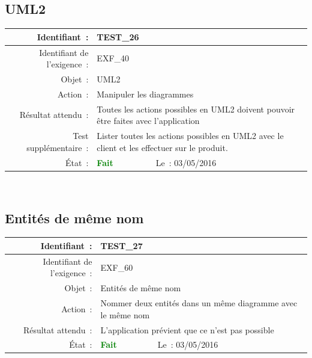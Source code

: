 \documentclass[hidelinks, a4paper,11pt,twoside,final]{article}
\begin{document}
    \subsection*{UML2}
    \begin{tabular}{|r|p{5cm}|p{5cm}|}\hline
    {Identifiant~:} & \multicolumn{2}{|p{10cm}|}{TEST\_26} \\\hline
    {Identifiant de l’exigence~:} & \multicolumn{2}{|p{10cm}|}{EXF\_40} \\\hline
        {Objet~:} & \multicolumn{2}{|p{10cm}|}{UML2} \\\hline
        {Action~:} & \multicolumn{2}{|p{10cm}|}{Manipuler les diagrammes} \\\hline
        {Résultat attendu~:} & \multicolumn{2}{|p{10cm}|}{Toutes les actions possibles en UML2 doivent pouvoir être faites avec l’application} \\\hline
        {Test supplémentaire~:} & \multicolumn{2}{|p{10cm}|}{Lister toutes les actions possibles en UML2 avec le client et les effectuer sur le produit.} \\\hline
        {État~:} & {\textcolor{green}{\textbf{Fait}}} & {Le~: 03/05/2016 } \\\hline
    \end{tabular}
    \\
    \newline

     \subsection*{Entités de même nom}
    \begin{tabular}{|r|p{5cm}|p{5cm}|}\hline
    {Identifiant~:} & \multicolumn{2}{|p{10cm}|}{TEST\_27} \\\hline
    {Identifiant de l’exigence~:} & \multicolumn{2}{|p{10cm}|}{EXF\_60} \\\hline
        {Objet~:} & \multicolumn{2}{|p{10cm}|}{Entités de même nom} \\\hline
        {Action~:} & \multicolumn{2}{|p{10cm}|}{Nommer deux entités dans un même diagramme avec le même nom} \\\hline
        {Résultat attendu~:} & \multicolumn{2}{|p{10cm}|}{L’application prévient que ce n’est pas possible} \\\hline
        {État~:} & {\textcolor{green}{\textbf{Fait}}} & {Le~: 03/05/2016 } \\\hline
    \end{tabular}
    \\
    \newline
\end{document}
